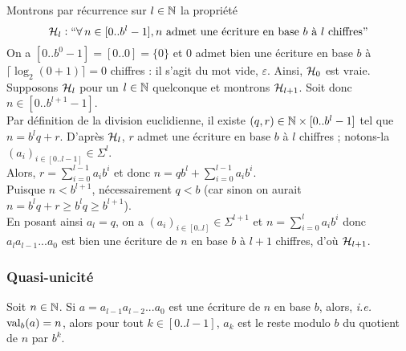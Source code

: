 			\eqskip{3mm}
			\begin{Preuve}
				Montrons par récurrence sur \(l\in\bb{N}\) la propriété
					\[\cal{H}_l : \text{``}\forall\,n\in[0..b^l-1], n \text{ admet une écriture en base \(b\) à \(l\) chiffres''}\]
				\bdot On a \([0..b^0-1]=[0..0] = \{0\}\) et 0 admet bien une écriture en base \(b\) à \(\lceil \log_2(0+1) \rceil = 0\) chiffres : il s'agit du mot vide, \(\varepsilon\). Ainsi, \(\cal{H}_0\) est vraie. \nt
				\bdot Supposons \(\cal{H}_l\) pour un \(l\in\bb{N}\) quelconque et montrons \(\cal{H}_{l+1}\). Soit donc \(n \in [0..b^{l+1}-1]\). \\
				Par définition de la division euclidienne, il existe \((q,r)\in\bb{N}\times[0..b^l-1]\) tel que \(n=b^lq+r\). D'après \(\cal{H}_l\), \(r\) admet une écriture en base \(b\) à \(l\) chiffres ; notons-la \((a_i)_{i\in[0..l-1]} \in \Sigma^l\). \\[1mm]
				Alors, \(r=\displaystyle\sum_{i=0}^{l-1}a_ib^i\) et donc \(\displaystyle n=qb^l + \sum_{i=0}^{l-1} a_ib^i\). \\[1mm]
				Puisque \(n < b^{l+1}\), nécessairement \(q < b\) (car sinon on aurait \(n=b^lq + r \geq b^lq \geq b^{l+1} \)). \\[1mm]
				En posant ainsi \(a_l=q\), on a \((a_i)_{i\in[0..l]} \in \Sigma^{l+1}\) et \(n = \displaystyle \sum\nolimits_{i=0}^{l} a_ib^i\) donc \(a_la_{l-1}...a_0\) est bien une écriture de \(n\) en base \(b\) à \(l+1\) chiffres, d'où \(\cal{H}_{l+1}\).
			\end{Preuve}
		
		\subsubsection{Quasi-unicité}
			
			\begin{Propriete}
				Soit \(n\in\bb{N}\). Si \(a = a_{l-1}a_{l-2}...a_0\) est une écriture de \(n\) en base \(b\), alors, \emph{i.e.} \(\val_b(a) = n\), alors pour tout \(k\in[0..l-1]\), \(a_k\) est le reste modulo \(b\) du quotient de \(n\) par \(b^k\).
			\end{Propriete}
		
			
